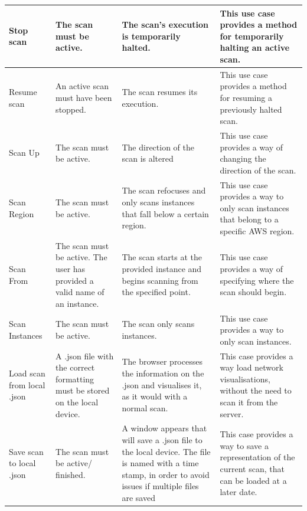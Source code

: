 \documentclass[a4paper,12pt]{report}
\begin{document}
\begin{center}
\begin{longtable}{| p{3cm} | p{4cm} | p{4cm} | p{4cm} |}
    Stop scan & The scan must be active. & The scan's execution is temporarily halted.  & This use case provides a method for temporarily halting an active scan.\\ \hline
    Resume scan & An active scan must have been stopped. & The scan resumes its execution. &  This use case provides a method for resuming a previously halted scan.\\ 
    \hline
	Scan Up & The scan must be active. & The direction of the scan is altered & This use case provides a way of changing the direction of the scan.\\ 
	\hline
    Scan Region & The scan must be active. & The scan refocuses and only scans instances that fall below a certain region. & This use case provides a way to only scan instances that belong to a specific AWS region.\\ \hline
    
    Scan From &  The scan must be active. The user has provided a valid name of an instance. & The scan starts at the provided instance and begins scanning from the specified point.  &  This use case provides a way of specifying where the scan should begin.\\ 
    \hline
    Scan Instances &  The scan must be active. & The scan only scans instances.  &  This use case provides a way to only scan instances.\\ 
    \hline
    
    Load scan from local .json & A .json file with the correct formatting must be stored on the local device. & The browser processes the information on the .json and visualises it, as it would with a normal scan. & This case provides a way load network visualisations, without the need to scan it from the server.\\ \hline
    Save scan to local .json & The scan must be active/ finished. & A window appears that will save a .json file to the local device. The file is named with a time stamp, in order to avoid issues if multiple files are saved & This case provides a way to save a representation of the current scan, that can be loaded at a later date.\\ 
    \hline
  \end{longtable}
\end{center}
\end{document}
